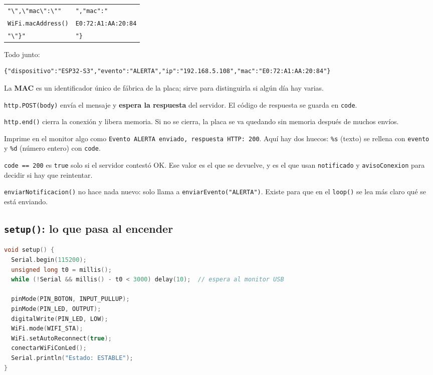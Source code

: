 \documentclass[11pt,a4paper]{article}
\begin{document}
\begin{description}[leftmargin=*,style=nextline]
\begin{center}
\begin{tabular}{@{}ll@{}}
        \texttt{"\textbackslash",\textbackslash"mac\textbackslash":\textbackslash""} & \texttt{","mac":"}\\
        \texttt{WiFi.macAddress()} & \texttt{E0:72:A1:AA:20:84}\\
        \texttt{"\textbackslash"\}"} & \texttt{"\}}\\
        \bottomrule
        \end{tabular}
        \end{center}
        Todo junto:
\begin{lstlisting}[numbers=none,language={}]
{"dispositivo":"ESP32-S3","evento":"ALERTA","ip":"192.168.5.108","mac":"E0:72:A1:AA:20:84"}
\end{lstlisting}
        La \textbf{MAC} es un identificador único de fábrica de la placa; sirve
        para distinguirla si algún día hay varias.
  \item[Línea 13 --- enviar]
        \texttt{http.POST(body)} envía el mensaje y \textbf{espera la respuesta} del
        servidor. El código de respuesta se guarda en \texttt{code}.
  \item[Línea 14 --- cerrar]
        \texttt{http.end()} cierra la conexión y libera memoria. Si no se cierra,
        la placa se va quedando sin memoria después de muchos envíos.
  \item[Línea 16 --- reportar]
        Imprime en el monitor algo como
        \texttt{Evento ALERTA enviado, respuesta HTTP: 200}. Aquí hay dos huecos:
        \texttt{\%s} (texto) se rellena con \texttt{evento} y \texttt{\%d} (número
        entero) con \texttt{code}.
  \item[Línea 17 --- ¿funcionó?]
        \texttt{code == 200} es \texttt{true} solo si el servidor contestó OK. Ese
        valor es el que se devuelve, y es el que usan \texttt{notificado} y
        \texttt{avisoConexion} para decidir si hay que reintentar.
  \item[Línea 20 --- atajo]
        \texttt{enviarNotificacion()} no hace nada nuevo: solo llama a
        \texttt{enviarEvento("ALERTA")}. Existe para que en el \texttt{loop()} se lea
        más claro qué se está enviando.
\end{description}

\subsection{\texttt{setup()}: lo que pasa al encender}

\begin{lstlisting}[language=C++]
void setup() {
  Serial.begin(115200);
  unsigned long t0 = millis();
  while (!Serial && millis() - t0 < 3000) delay(10);  // espera al monitor USB

  pinMode(PIN_BOTON, INPUT_PULLUP);
  pinMode(PIN_LED, OUTPUT);
  digitalWrite(PIN_LED, LOW);
  WiFi.mode(WIFI_STA);
  WiFi.setAutoReconnect(true);
  conectarWiFiConLed();
  Serial.println("Estado: ESTABLE");
}
\end{lstlisting}
\end{document}
